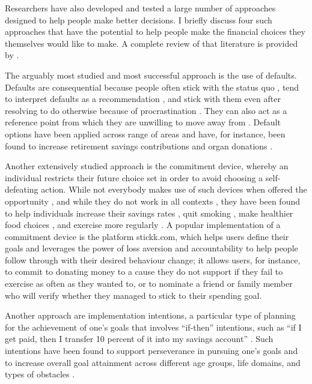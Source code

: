 Researchers have also developed and tested a large number of approaches
designed to help people make better decisions. I briefly discuss four such approaches
that have the potential to help people make the financial choices they
themselves would like to make. A complete review of that literature is provided
by \citet{duckworth2018beyond}.

The arguably most studied and most successful approach is the use of defaults. Defaults are consequential because people often stick
with the status quo \citep{samuelson1988status}, tend to
interpret defaults as a recommendation \citep{mckenzie2006recommendations}, and stick with them even after resolving to do otherwise because of procrastination \citep{carroll2009optimal, ericson2017interaction}. They can also act as a reference point from which they are unwilling to move away from \citep{johnson2003defaults, kahneman1979prospect}. Default options have been
applied across range of areas and have, for instance, been found to increase
retirement savings contributions \citep{thaler2004save, madrian2001power,
beshears2009importance} and organ donations \citep{johnson2003defaults,
gimbel2003presumed, abadie2006impact}.

Another extensively studied approach is the commitment device, whereby an
individual restricts their future choice set in order to avoid choosing a
self-defeating action. While not everybody makes use of such devices when
offered the opportunity \citep{bryan2010commitment}, and while they do not work
in all contexts \citep{laibson2015don,robinson2018some}, they have been found
to help individuals increase their savings rates \citep{ashraf2006tying}, quit
smoking \citep{gine2010put}, make healthier food choices
\citep{schwartz2014healthier}, and exercise more regularly
\citep{royer2015incentives}. A popular implementation of a commitment device is
the platform stickk.com, which helps users
define their goals and leverages the power of loss aversion and accountability
to help people follow through with their desired behaviour change; it allows
users, for instance, to commit to donating money to a cause they do not support
if they fail to exercise as often as they wanted to, or to nominate a friend or
family member who will verify whether they managed to stick to their spending
goal.

Another approach are implementation intentions, a particular type of planning
for the achievement of one's goals that involves ``if-then'' intentions, such as
``if I get paid, then I transfer 10 percent of it into my savings account''
\citep{gollwitzer2006implementation, rogers2015beyond}. Such intentions have
been found to support perseverance in pursuing one's goals
\citep{oettingen2010strategies} and to increase overall goal attainment across
different age groups, life domains, and types of obstacles
\citep{gollwitzer2006implementation}.

